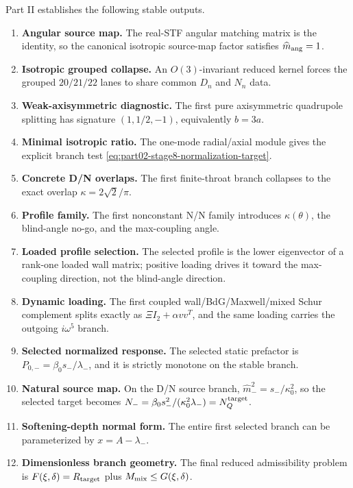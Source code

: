 Part II establishes the following stable outputs.
\begin{enumerate}[leftmargin=2.2em]
  \item \textbf{Angular source map.}  The real-STF angular matching matrix is the identity, so the canonical isotropic source-map factor satisfies \(\widehat m_{\rm ang}=1\).
  \item \textbf{Isotropic grouped collapse.}  An \(O(3)\)-invariant reduced kernel forces the grouped \(20/21/22\) lanes to share common \(D_n\) and \(N_n\) data.
  \item \textbf{Weak-axisymmetric diagnostic.}  The first pure axisymmetric quadrupole splitting has signature \((1,1/2,-1)\), equivalently \(b=3a\).
  \item \textbf{Minimal isotropic ratio.}  The one-mode radial/axial module gives the explicit branch test \eqref{eq:part02-stage8-normalization-target}.
  \item \textbf{Concrete D/N overlaps.}  The first finite-throat branch collapses to the exact overlap \(\kappa=2\sqrt2/\pi\).
  \item \textbf{Profile family.}  The first nonconstant N/N family introduces \(\kappa(\theta)\), the blind-angle no-go, and the max-coupling angle.
  \item \textbf{Loaded profile selection.}  The selected profile is the lower eigenvector of a rank-one loaded wall matrix; positive loading drives it toward the max-coupling direction, not the blind-angle direction.
  \item \textbf{Dynamic loading.}  The first coupled wall/BdG/Maxwell/mixed Schur complement splits exactly as \(\Xi I_2+\alpha vv^T\), and the same loading carries the outgoing \(i\omega^5\) branch.
  \item \textbf{Selected normalized response.}  The selected static prefactor is \(P_{0,-}=\beta_0s_-/\lambda_-\), and it is strictly monotone on the stable branch.
  \item \textbf{Natural source map.}  On the D/N source branch, \(\widehat m_-^2=s_-/\kappa_0^2\), so the selected target becomes \(N_-=\beta_0s_-^2/(\kappa_0^2\lambda_-)=N_Q^{\rm target}\).
  \item \textbf{Softening-depth normal form.}  The entire first selected branch can be parameterized by \(x=A-\lambda_-\).
  \item \textbf{Dimensionless branch geometry.}  The final reduced admissibility problem is \(F(\xi,\delta)=R_{\rm target}\) plus \(M_{\rm mix}\leq G(\xi,\delta)\).
\end{enumerate}

